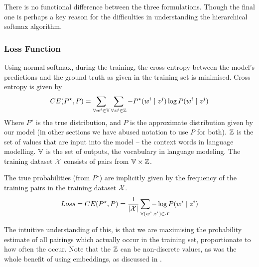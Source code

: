 \documentclass[parskip]{komatufte}
\begin{document}
There is no functional difference between the three formulations.
Though the final one is perhaps a key reason for the difficulties in understanding the hierarchical softmax algorithm.

\subsubsection{Loss Function}\label{sec:softmax-loss-function}


Using normal softmax, during the training, the cross-entropy between the model's predictions and the ground truth as given in the training set is minimised.
Cross entropy is given by
\begin{equation}
CE(P^\star, P) = \sum_{\forall \n w_i\in \set{V}} \sum_{\forall \n z_j \in \set{Z}} -P^\star(\n w_i \mid \n z_j) \log P(\n w_i \mid \n z_j)
\end{equation}
Where $P^\star$ is the true distribution, and $P$ is the approximate distribution given by our model (in other sections we have abused notation to use $P$ for both).
$\mathbb{Z}$ is the set of values that are input into the model -- the context words in language modelling.
$\mathbb{V}$ is the set of outputs, the vocabulary in language modeling.
The training dataset $\mathcal{X}$ consists of pairs from $\mathbb{V} \times \mathbb{Z}$.

The true probabilities (from $P^\star$) are implicitly given by the frequency of the training pairs in the training dataset $\mathcal{X}$.
\begin{equation}
Loss=CE(P^\star, P) = \frac{1}{|\seq{X}|} \sum_{\mathrlap{\!\!\!\!\!\forall (\n w_i, \n z_i) \in \seq{X}}} -\log P(\n w_i \mid \n z_i)
\end{equation}


The intuitive understanding of this, is that we are maximising the probability estimate of all pairings which actually occur in the training set, proportionate to how often the occur.
Note that the $\mathbb{Z}$ can be non-discrete values, as was the whole benefit of using embeddings, as discussed in .
\end{document}
